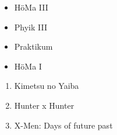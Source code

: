 \documentclass{scrartcl} %
\begin{document}
    \begin{itemize}
        \item HöMa III
        \item Phyik III
        \item Praktikum
        \item HöMa I
    \end{itemize}
    \begin{enumerate}
        \item Kimetsu no Yaiba
        \item Hunter x Hunter
        \item X-Men: Days of future past
    \end{enumerate}
\end{document}
